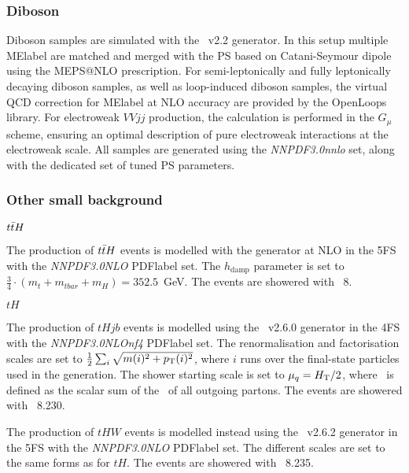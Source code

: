 \subsubsection{Diboson}
Diboson samples are simulated with the \SHERPA~v2.2 generator. In this setup multiple \acrshort{MElabel} are matched and merged with the \SHERPA PS based on Catani-Seymour dipole using the MEPS@NLO prescription. For semi-leptonically and fully leptonically decaying diboson samples, as well as loop-induced diboson samples, the virtual QCD correction for \acrshort{MElabel} at NLO accuracy are provided by the OpenLoops library. For electroweak $VVjj$ production, the calculation is performed in the $G_\mu$ scheme, ensuring an optimal description of pure electroweak interactions at the electroweak scale. All samples are generated using
the \textit{NNPDF3.0nnlo} set, along with the dedicated set of tuned PS parameters.

\subsubsection{Other small background}

\textit{$t\bar{t} H$}

The production of $t\bar{t} H$ events is modelled with the \POWHEGBOX generator at NLO in the 5FS with the \textit{NNPDF3.0NLO} \acrshort{PDFlabel} set. The $h_\text{damp}$ parameter is set to $\frac{3}{4}\cdot(m_t + m_{tbar} + m_H ) = 352.5$~GeV. The events are showered with \PYTHIA~8.%

\textit{$tH$}

The production of $tHjb$ events is modelled using the \MGMCatNLO~v2.6.0 generator in the 4FS with the \textit{NNPDF3.0NLOnf4} \acrshort{PDFlabel} set. The renormalisation and factorisation scales are set to $\frac{1}{2}\sum_i\sqrt{m(i)^2+p_{\text{T}}(i)^2}$, where $i$ runs over the final-state particles used in the generation. The shower starting scale is set to $\mu_q = H_{\text{T}} /2$, where \HT\ is defined as the scalar sum of the \pT\
of all outgoing partons. The events are showered with \PYTHIA~8.230.

The production of $tHW$ events is modelled instead using the \MGMCatNLO~v2.6.2 generator in the 5FS with the \textit{NNPDF3.0NLO} \acrshort{PDFlabel} set. The different scales are set to the same forms as for $tH$. The events are showered with \PYTHIA~8.235.

